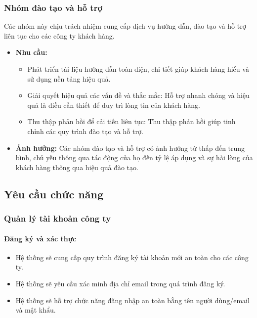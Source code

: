 \subsubsection{Nhóm đào tạo và hỗ trợ}

Các nhóm này chịu trách nhiệm cung cấp dịch vụ hướng dẫn, đào tạo và hỗ trợ liên tục cho các công ty khách hàng.

\begin{itemize}
    \item \textbf{Nhu cầu:}
    \begin{itemize}
        \item Phát triển tài liệu hướng dẫn toàn diện, chi tiết giúp khách hàng hiểu và sử dụng nền tảng hiệu quả.
        \item Giải quyết hiệu quả các vấn đề và thắc mắc: Hỗ trợ nhanh chóng và hiệu quả là điều cần thiết để duy trì lòng tin của khách hàng.
        \item Thu thập phản hồi để cải tiến liên tục: Thu thập phản hồi giúp tinh chỉnh các quy trình đào tạo và hỗ trợ.
    \end{itemize}
    \item \textbf{Ảnh hưởng:} Các nhóm đào tạo và hỗ trợ có ảnh hưởng từ thấp đến trung bình, chủ yếu thông qua tác động của họ đến tỷ lệ áp dụng và sự hài lòng của khách hàng thông qua hiệu quả đào tạo.
\end{itemize}


\subsection{Yêu cầu chức năng}

\subsubsection{Quản lý tài khoản công ty}

\paragraph{Đăng ký và xác thực}
\begin{itemize}
    \item Hệ thống sẽ cung cấp quy trình đăng ký tài khoản mới an toàn cho các công ty.
    \item Hệ thống sẽ yêu cầu xác minh địa chỉ email trong quá trình đăng ký.
    \item Hệ thống sẽ hỗ trợ chức năng đăng nhập an toàn bằng tên người dùng/email và mật khẩu.
\end{itemize}

